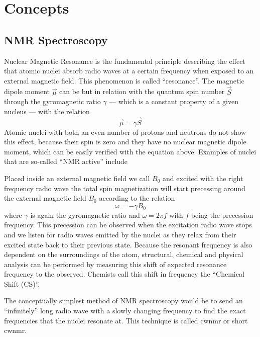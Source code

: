 \chapter{Concepts}


\section{NMR Spectroscopy}

Nuclear Magnetic Resonance is the fundamental principle describing the effect that atomic nuclei absorb radio waves at a certain frequency when exposed to an external magnetic field. This phenomenon is called \enquote{resonance}. The magnetic dipole moment \(\vec{\mu}\) can be but in relation with the quantum spin number \(\vec{S}\) through the gyromagnetic ratio \(\gamma\) --- which is a constant property of a given nucleus --- with the relation
\[
    \vec{\mu} = \gamma\vec{S}
\]
Atomic nuclei with both an even number of protons and neutrons do not show this effect, because their spin is zero and they have no nuclear magnetic dipole moment, which can be easily verified with the equation above. Examples of nuclei that are so-called \enquote{NMR active} include \ch{}

Placed inside an external magnetic field we call \(B_0\) and excited with the right frequency radio wave the total spin magnetization will start precessing around the external magnetic field \(B_0\) according to the relation
\[
    \omega = -\gamma{}B_0
\]
where \(\gamma\) is again the gyromagnetic ratio and \(\omega = 2\pi{}f\) with \(f\) being the precession frequency. This precession can be observed when the excitation radio wave stops and we listen for radio waves emitted by the nuclei as they relax from their excited state back to their previous state. Because the resonant frequency is also dependent on the surroundings of the atom, structural, chemical and physical analysis can be performed by measuring this shift of expected resonance frequency to the observed. Chemists call this shift in frequency the \enquote{Chemical Shift (CS)}.

The conceptually simplest method of NMR spectroscopy would be to send an \enquote{infinitely} long radio wave with a slowly changing frequency to find the exact frequencies that the nuclei resonate at. This technique is called \acrlong{cwnmr} or short \acrshort{cwnmr}.

